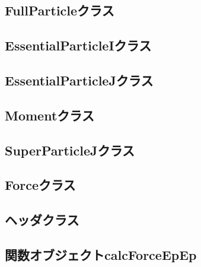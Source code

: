 \subsection{FullParticleクラス}
\label{sec:fullparticle}



\subsection{EssentialParticleIクラス}
\label{sec:essentialparticlei}



\subsection{EssentialParticleJクラス}
\label{sec:essentialparticlej}



\subsection{Momentクラス}
\label{sec:moment}



\subsection{SuperParticleJクラス}
\label{sec:superparticlej}



\subsection{Forceクラス}
\label{sec:force}



\subsection{ヘッダクラス}
\label{sec:userdefined_header}



\subsection{関数オブジェクトcalcForceEpEp}
\label{sec:userdefined_calcForceEpEp}


